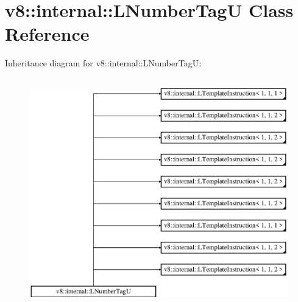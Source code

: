 \hypertarget{classv8_1_1internal_1_1_l_number_tag_u}{}\section{v8\+:\+:internal\+:\+:L\+Number\+TagU Class Reference}
\label{classv8_1_1internal_1_1_l_number_tag_u}
Inheritance diagram for v8\+:\+:internal\+:\+:L\+Number\+TagU\+:\begin{figure}[H]
\begin{center}
\leavevmode
\includegraphics[height=10.000000cm]{classv8_1_1internal_1_1_l_number_tag_u}
\end{center}
\end{figure}
